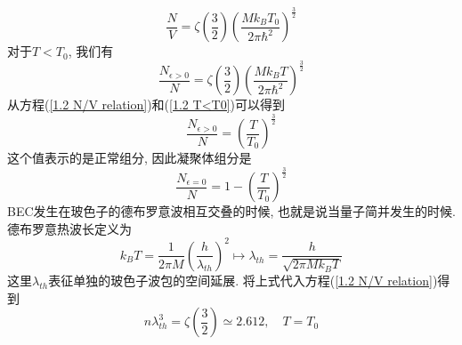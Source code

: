 \documentclass{book}
\begin{document}
\begin{equation}\label{1.2 N/V relation}
  \frac{N}{V}=\zeta\left(\frac{3}{2}\right)\left(\frac{Mk_BT_0}{2\pi\hbar^2}\right)^{\frac{3}{2}}
\end{equation}
对于$T<T_0$, 我们有
\begin{equation}\label{1.2 T<T0}
  \frac{N_{\epsilon>0}}{N}=\zeta\left(\frac{3}{2}\right)\left(\frac{Mk_BT}{2\pi\hbar^2}\right)^{\frac{3}{2}}
\end{equation}
从方程(\eqref{1.2 N/V relation})和(\eqref{1.2 T<T0})可以得到
\begin{equation}
  \frac{N_{\epsilon>0}}{N}=\left(\frac{T}{T_0}\right)^{\frac{3}{2}}
\end{equation}
这个值表示的是正常组分, 因此凝聚体组分是
\begin{equation}
  \frac{N_{\epsilon=0}}{N}=1-\left(\frac{T}{T_0}\right)^{\frac{3}{2}}
\end{equation}
BEC发生在玻色子的德布罗意波相互交叠的时候, 也就是说当量子简并发生的时候. 德布罗意热波长定义为
\begin{equation}
  k_BT=\frac{1}{2\pi M}\left(\frac{h}{\lambda_{th}}\right)^2\longmapsto\lambda_{th}=\frac{h}{\sqrt{2\pi Mk_BT}}
\end{equation}
这里$\lambda_{th}$表征单独的玻色子波包的空间延展. 将上式代入方程(\eqref{1.2 N/V relation})得到
\begin{equation}\label{1.2 nlambda th}
  n\lambda_{th}^3=\zeta\left(\frac{3}{2}\right)\simeq2.612,\quad T=T_0
\end{equation}
\end{document}
